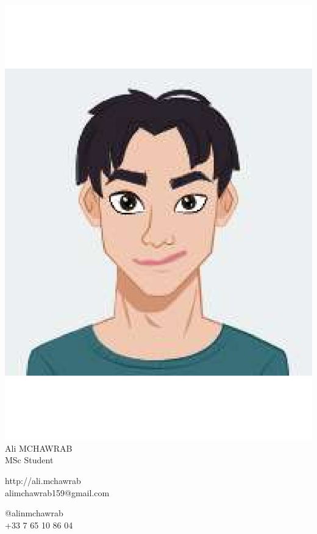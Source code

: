 \documentclass[8pt]{extarticle}
\begin{document}
\fontsize{6}{7}\selectfont
\centering
\includegraphics[width=0.18\linewidth]{logo}\\[-1pt]

Ali MCHAWRAB\\[-1pt]
MSc Student\\[3pt]

\begin{multicols}{2}
\raggedright
http://ali.mchawrab\\
alimchawrab159@gmail.com

\columnbreak
\raggedleft
@alinmchawrab\\
+33 7 65 10 86 04
\end{multicols}
\end{document}
